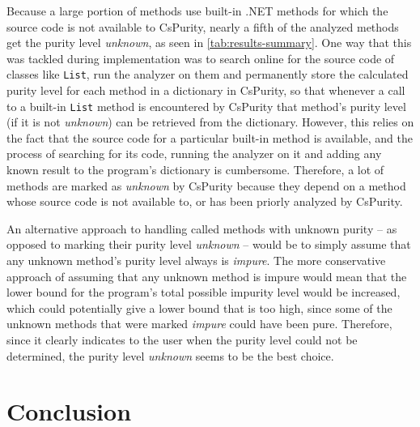 \documentclass[a4paper,12pt]{article}
\begin{document}

Because a large portion of methods use built-in .NET methods for which the source code is not available to CsPurity, nearly a fifth of the analyzed methods get the purity level \textit{unknown}, as seen in \autoref{tab:results-summary}. One way that this was tackled during implementation was to search online for the source code of classes like \texttt{List}, run the analyzer on them and permanently store the calculated purity level for each method in a dictionary in CsPurity, so that whenever a call to a built-in \texttt{List} method is encountered by CsPurity that method's purity level (if it is not \textit{unknown}) can be retrieved from the dictionary. However, this relies on the fact that the source code for a particular built-in method is available, and the process of searching for its code, running the analyzer on it and adding any known result to the program's dictionary is cumbersome. Therefore, a lot of methods are marked as \textit{unknown} by CsPurity because they depend on a method whose source code is not available to, or has been priorly analyzed by CsPurity.

An alternative approach to handling called methods with unknown purity -- as opposed to marking their purity level \textit{unknown} -- would be to simply assume that any unknown method's purity level always is \textit{impure}. The more conservative approach of assuming that any unknown method is impure would mean that the lower bound for the program's total possible impurity level would be increased, which could potentially give a lower bound that is too high, since some of the unknown methods that were marked \textit{impure} could have been pure. Therefore, since it clearly indicates to the user when the purity level could not be determined, the purity level \textit{unknown} seems to be the best choice.

\section{Conclusion} \label{sec:conclusion}

\end{document}

